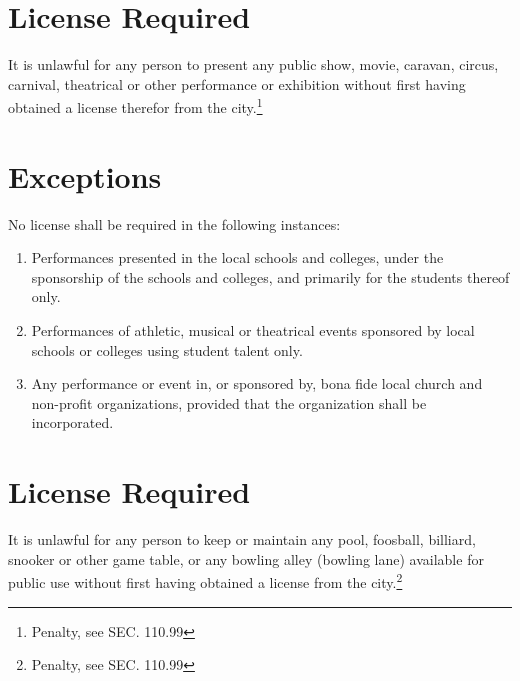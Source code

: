 
\setcounter{section}{29}
\section{License Required}
It is unlawful for any person to present any public show, movie, caravan, circus, carnival, theatrical or other performance or exhibition without first having obtained a license therefor from the city.\footnote{Penalty, see SEC. 110.99}

\section{Exceptions}
No license shall be required in the following instances:
\begin{enumerate}[{\indent}A)]
    \item Performances presented in the local schools and colleges, under the sponsorship of the schools and colleges, and primarily for the students thereof only.
    \item Performances of athletic, musical or theatrical events sponsored by local schools or colleges using student talent only.
    \item Any performance or event in, or sponsored by, bona fide local church and non-profit organizations, provided that the organization shall be incorporated.
\end{enumerate}


\setcounter{section}{44}
\section{License Required}
It is unlawful for any person to keep or maintain any pool, foosball, billiard, snooker or other game table, or any bowling alley (bowling lane) available for public use without first having obtained a license from the city.\footnote{Penalty, see SEC. 110.99}

